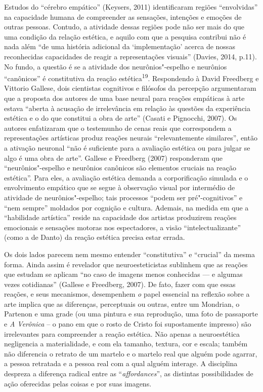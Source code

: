Estudos do ``cérebro empático'' (Keysers, 2011) identificaram regiões
``envolvidas'' na capacidade humana de compreender as sensações,
intenções e emoções de outras pessoas. Contudo, a atividade dessas
regiões pode não ser mais do que uma condição da relação estética, e
aquilo com que a pesquisa contribui não é nada além ``de uma história
adicional da `implementação' acerca de nossas reconhecidas capacidades
de reagir a representações visuais'' (Davies, 2014, p.11). No fundo, a
questão é se a atividade dos neurônios"-espelho e neurônios ``canônicos''
é constitutiva da reação estética\textsuperscript{19}. Respondendo à
David Freedberg e Vittorio Gallese, dois cientistas cognitivos e
filósofos da percepção argumentaram que a proposta dos autores de uma
base neural para reações empáticas à arte estava ``aberta à acusação de
irrelevância em relação às questões da experiência estética e o do que
constitui a obra de arte'' (Casati e Pignocchi, 2007). Os autores
enfatizaram que o testemunho de cenas reais que correspondem a
representações artísticas produz reações neurais ``relevantemente
similares'', então a ativação neuronal ``não é suficiente para a
avaliação estética ou para julgar se algo é uma obra de arte''. Gallese
e Freedberg (2007) responderam que ``neurônios"-espelho e neurônios
canônicos são elementos cruciais na reação estética''. Para eles, a
avaliação estética demanda a corporificação simulada e o envolvimento
empático que se segue à observação visual por intermédio de atividade de
neurônios"-espelho; tais processos ``podem ser pré"-cognitivos'' e ``nem
sempre'' moldados por cognição e cultura. Ademais, na medida em que a
``habilidade artística'' reside na capacidade dos artistas produzirem
reações emocionais e sensações motoras nos espectadores, a visão
``intelectualizante'' (como a de Danto) da reação estética precisa estar
errada.

Os dois lados parecem nem mesmo entender ``constitutiva'' e ``crucial''
da mesma forma. Ainda assim é revelador que neuroesteticistas sublinhem
que as reações que estudam se aplicam ``no caso de imagens menos
conhecidas --- e algumas vezes cotidianas'' (Gallese e Freedberg, 2007).
De fato, fazer com que essas reações, e seus mecanismos, desempenhem
\emph{o} papel essencial na reflexão sobre a arte implica que as
diferenças, perceptuais ou outras, entre um Mondrian, o Partenon e uma
grade (ou uma pintura e sua reprodução, uma foto de passaporte e \emph{A
Verônica} -- o pano em que o rosto de Cristo foi supostamente impresso)
são irrelevantes para compreender a reação estética. Não apenas a
neuroestética negligencia a materialidade, e com ela tamanho, textura,
cor e escala; também não diferencia o retrato de um martelo e o martelo
real que alguém pode agarrar, a pessoa retratada e a pessoa real com a
qual alguém interage. A disciplina despreza a diferença radical entre as
``\emph{affordances}'', as distintas possibilidades de ação oferecidas
pelas coisas e por suas imagens.

